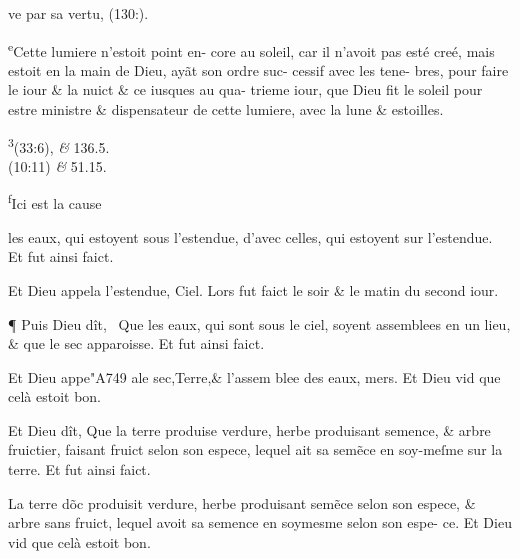 \documentclass[twocolumn,paper=a4,pagesize=pdftex,12pt,headinclude=on]{scrbook}
\newcommand{\fakenote}[3][\space]{%
   \par\noindent#1\textsuperscript#2\justifying#3
}
\newcounter{verse}
\newcommand{\bverse}{%
  \addtocounter{verse}{1}
  \theverse\quad
}
\begin{document}
{{ ve par sa vertu, \linebreak
 (130:).}
   \fakenote{e}{Cette lumiere \linebreak
 n'estoit point en- \linebreak
 core au soleil, car \linebreak
 il n'avoit pas esté \linebreak
 creé, mais estoit en \linebreak
 la main de Dieu, \linebreak
 ay\~at son ordre suc- \linebreak
 cessif avec les tene- \linebreak
 bres, pour faire le \linebreak
 iour \& la nuict \& \linebreak
 ce iusques au qua- \linebreak
 trieme iour, que \linebreak
 Dieu fit le soleil \linebreak
 pour estre ministre \linebreak
 \& dispensateur de \linebreak
 cette lumiere, avec \linebreak
 la lune \& estoilles.}
   \fakenote{3}{(33:6), \textit\& 136.5.\\
                \bibleverse{Je}(10:11) \textit\& 51.15.}
   \fakenote{f}{Ici est la cause}
}
 \pagebreak

 \noindent les eaux, qui estoyent sous
 l'estendue, d'avec celles, qui estoyent sur l'esten\-due. Et fut ainsi faict.

\bverse Et Dieu appela l'estendue, Ciel.
 Lors fut faict le soir \& le matin du second iour.

\bverse ¶ Puis Dieu dît, 
 \footnotemarkverse{}~\footnotemarkmain{}Que les eaux,
 qui sont sous le ciel,
 soyent assemblees en un lieu, \& que le sec apparoisse. Et fut ainsi faict.

\bverse Et Dieu appe\char"A749 ale sec,Terre,\& l'assem \linebreak
 blee des eaux, mers.
 Et Dieu vid que celà estoit bon.

\bverse Et Dieu dît, Que la terre produise verdure, herbe produisant semence,
 \& arbre fruictier, faisant fruict selon son espece, lequel ait sa sem\~ece
 en soy-meſ\-me sur la terre. Et fut ainsi faict.

\bverse La terre d\~oc produisit verdure, her\-be produisant sem\~ece
 selon son espece, \& arbre sans fruict, lequel avoit sa \linebreak
  semence en soymesme selon son espe- \linebreak
 ce. Et Dieu vid que celà estoit bon.
\end{document}
